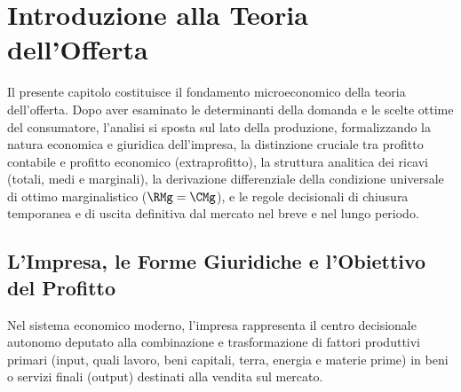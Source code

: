 \chapter{Introduzione alla Teoria dell'Offerta}
\label{chap:introduzione_teoria_offerta}

\begin{tcolorbox}[colback=navyblue!5!white, colframe=navyblue, title=\textbf{Quadro Concettuale del Capitolo}]
Il presente capitolo costituisce il fondamento microeconomico della teoria dell'offerta. Dopo aver esaminato le determinanti della domanda e le scelte ottime del consumatore, l'analisi si sposta sul lato della produzione, formalizzando la natura economica e giuridica dell'impresa, la distinzione cruciale tra profitto contabile e profitto economico (extraprofitto), la struttura analitica dei ricavi (totali, medi e marginali), la derivazione differenziale della condizione universale di ottimo marginalistico ($\RMg = \CMg$), e le regole decisionali di chiusura temporanea e di uscita definitiva dal mercato nel breve e nel lungo periodo.
\end{tcolorbox}

\section{L'Impresa, le Forme Giuridiche e l'Obiettivo del Profitto}

Nel sistema economico moderno, l'impresa rappresenta il centro decisionale autonomo deputato alla combinazione e trasformazione di fattori produttivi primari (input, quali lavoro, beni capitali, terra, energia e materie prime) in beni o servizi finali (output) destinati alla vendita sul mercato. 

